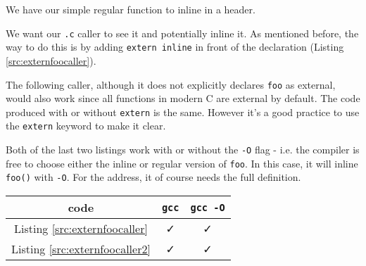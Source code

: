 \documentclass[a4paper]{article}
\begin{document}
\begin{exmp}
We have our simple regular function to inline in a header.

We want our \texttt{.c} caller to see it and potentially inline it. As mentioned before, the way to do this is by adding \texttt{extern inline} in front of the declaration (Listing \ref{src:externfoocaller}).

The following caller, although it does not explicitly declares \texttt{foo} as external, would also work since all functions in modern C are external by default. The code produced with or without \texttt{extern} is the same. However it's a good practice to use the \texttt{extern} keyword to make it clear.

\textup{
Both of the last two listings work with or without the \texttt{-O} flag - i.e. the compiler is free to choose either the inline or regular version of \texttt{foo}. In this case, it will inline \texttt{foo()} with \texttt{-O}. For the address, it of course needs the full definition.
}
\begin{center}%
    \begin{tabular}
    [c]{c|c|c}%
    code  & \texttt{gcc} & \texttt{gcc -O} \\\hline
    Listing \ref{src:externfoocaller} & \faCheck & \faCheck \\
    Listing \ref{src:externfoocaller2} & \faCheck & \faCheck \\
    \end{tabular}
\end{center}
\end{exmp}
\end{document}
